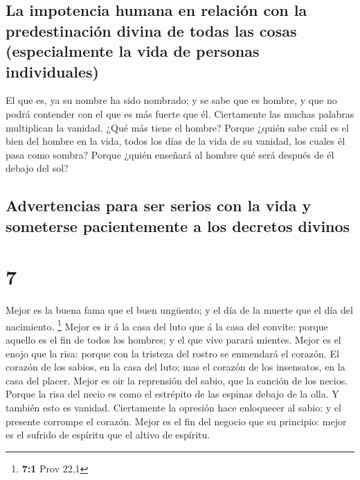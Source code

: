\hypertarget{la-impotencia-humana-en-relaciuxf3n-con-la-predestinaciuxf3n-divina-de-todas-las-cosas-especialmente-la-vida-de-personas-individuales}{%
\subsection{La impotencia humana en relación con la predestinación
divina de todas las cosas (especialmente la vida de personas
individuales)}\label{la-impotencia-humana-en-relaciuxf3n-con-la-predestinaciuxf3n-divina-de-todas-las-cosas-especialmente-la-vida-de-personas-individuales}}

 El que es, ya su nombre ha sido nombrado; y se sabe que es
hombre, y que no podrá contender con el que es más fuerte que él.
 Ciertamente las muchas palabras multiplican la vanidad.
¿Qué más tiene el hombre?  Porque ¿quién sabe cuál es el
bien del hombre en la vida, todos los días de la vida de su vanidad, los
cuales él pasa como sombra? Porque ¿quién enseñará al hombre qué será
después de él debajo del sol?

\hypertarget{advertencias-para-ser-serios-con-la-vida-y-someterse-pacientemente-a-los-decretos-divinos}{%
\subsection{Advertencias para ser serios con la vida y someterse
pacientemente a los decretos
divinos}\label{advertencias-para-ser-serios-con-la-vida-y-someterse-pacientemente-a-los-decretos-divinos}}

\hypertarget{section-6}{%
\section{7}\label{section-6}}

 Mejor es la buena fama que el buen ungüento; y el día de la
muerte que el día del nacimiento. \footnote{\textbf{7:1} Prov 22,1}
 Mejor es ir á la casa del luto que á la casa del convite:
porque aquello es el fin de todos los hombres; y el que vive parará
mientes.  Mejor es el enojo que la risa: porque con la
tristeza del rostro se enmendará el corazón.  El corazón de
los sabios, en la casa del luto; mas el corazón de los insensatos, en la
casa del placer.  Mejor es oir la reprensión del sabio, que
la canción de los necios.  Porque la risa del necio es como
el estrépito de las espinas debajo de la olla. Y también esto es
vanidad.  Ciertamente la opresión hace enloquecer al sabio:
y el presente corrompe el corazón.  Mejor es el fin del
negocio que su principio: mejor es el sufrido de espíritu que el altivo
de espíritu.

